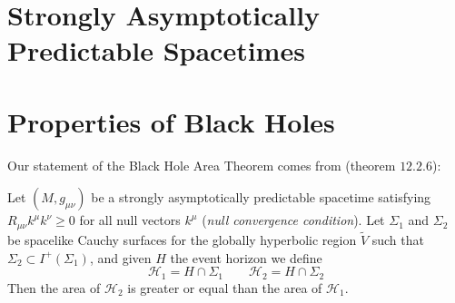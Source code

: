 \section{Strongly Asymptotically Predictable Spacetimes}

\section{Properties of Black Holes}


Our statement of the Black Hole Area Theorem comes from \cite{wald2010general} (theorem \(12.2.6\)):
\begin{theorem}
	Let \((M, g_{\mu\nu})\) be a strongly asymptotically predictable spacetime satisfying \(R_{\mu\nu}k^{\mu}k^{\nu} \ge 0\) for all null vectors \(k^{\mu}\) (\emph{null convergence condition}). Let \(\Sigma_1\) and \(\Sigma_2\) be spacelike Cauchy surfaces for the globally hyperbolic region \(\tilde{V}\) such that \(\Sigma_2 \subset I^+(\Sigma_1)\), and given \(H\) the event horizon we define
	\[
	\mathscr{H}_1 = H \cap \Sigma_1 \quad \quad \mathscr{H}_2 = H \cap \Sigma_2
	\]
	Then the area of \(\mathcal{H}_2\) is greater or equal than the area of \(\mathcal{H}_1\).
\end{theorem}

